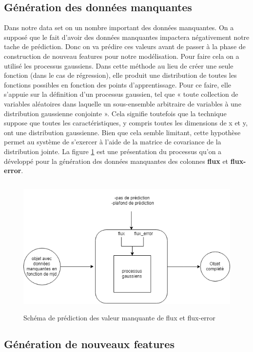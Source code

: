 \subsection{Génération des données manquantes}
 Dans notre data set on un nombre important des données manquantes. On a supposé que le fait d’avoir des données manquantes impactera négativement notre tache de prédiction. Donc on va prédire ces valeurs avant de passer à la phase de construction de nouveau features pour notre modélisation. Pour faire cela on a utilisé les processus gaussiens. Dans cette méthode au lieu de créer une seule fonction  (dans le cas de régression), elle produit une distribution de toutes les fonctions possibles en fonction des points d'apprentissage. Pour ce faire, elle s’appuie sur la définition d’un processus gaussien, tel que « toute collection de variables aléatoires dans laquelle un sous-ensemble arbitraire de variables à une distribution gaussienne conjointe ». Cela signifie toutefois que la technique suppose que toutes les caractéristiques, y compris toutes les dimensions de x et y, ont une distribution gaussienne. Bien que cela semble limitant, cette hypothèse permet au système de s'exercer à l'aide de la matrice de covariance de la distribution jointe.
La figure \ref{fig:blackbox_shema} est une présentation du processus qu'on a développé pour la génération des données manquantes  des colonnes \textbf{flux} et \textbf{flux-error}.
\begin{figure}[!h]
    \centering
    \includegraphics[width=12cm,height=7cm]{report/figures/blackbox.png}
    \caption{Schéma de prédiction des valeur manquante de flux et flux-error}
    \label{fig:blackbox_shema}
\end{figure}
\subsection{Génération de nouveaux features}

